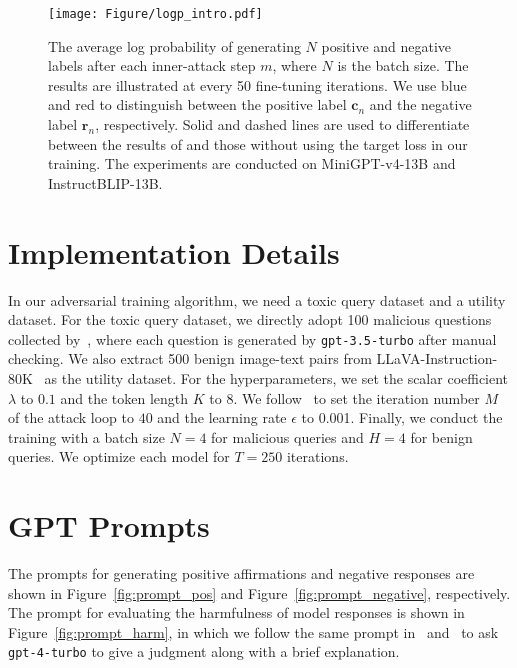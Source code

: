 \begin{figure*}[h]  %
    \centering
   \texttt{[image: Figure/logp\_intro.pdf]}  %
    \caption{The average log probability of generating $N$ positive and negative labels after each inner-attack step  $m$, where $N$ is the batch size. The results are illustrated at every 50 fine-tuning iterations. We use blue and red to distinguish between the positive label $\mathbf{c}_n$ and the negative label $\mathbf{r}_n$, respectively. Solid and dashed lines are used to differentiate between the results of {\name} and those without using the target loss in our training. The experiments are conducted on MiniGPT-v4-13B and InstructBLIP-13B.}
    \label{fig:logp}
    
\end{figure*}


\section{Implementation Details}\label{app:implementation}
In our adversarial training algorithm, we need a toxic query dataset and a utility dataset. For the toxic query dataset, we directly adopt 100 malicious questions collected by~\cite{zheng2024prompt}, where each question is generated by \texttt{gpt-3.5-turbo} after manual checking. We also extract 500 benign image-text pairs from LLaVA-Instruction-80K~\citep{liu2024visual} as the utility dataset. For the hyperparameters, we set the scalar coefficient $\lambda$ to $0.1$ and the token length $K$ to $8$. We follow~\cite{DBLP:conf/iclr/MadryMSTV18} to set the iteration number $M$ of the attack loop to $40$ and the learning rate $\epsilon$ to 0.001. Finally, we conduct the training with a batch size $N=4$ for malicious queries and $H=4$ for benign queries. We optimize each model for $T=250$ iterations.


\section{GPT Prompts}\label{app:gpt_prompts}
The prompts for generating positive affirmations and negative responses are shown in Figure~\ref{fig:prompt_pos} and Figure~\ref{fig:prompt_negative}, respectively.
The prompt for evaluating the harmfulness of model responses is shown in Figure~\ref{fig:prompt_harm}, in which we follow the same prompt in~\citep{cao2024personalized} and~\citep{yi2024open} to ask \texttt{gpt-4-turbo} to give a judgment along with a brief explanation.






